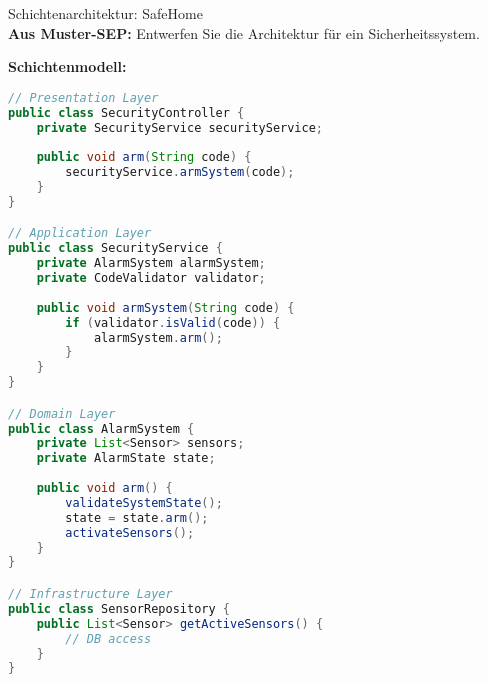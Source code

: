 \begin{example2}[breakable]{Schichtenarchitektur: SafeHome}\\
    \small
\textbf{Aus Muster-SEP:} Entwerfen Sie die Architektur für ein Sicherheitssystem.

\textbf{Schichtenmodell:}
\begin{lstlisting}[language=Java, style=basesmol]
// Presentation Layer
public class SecurityController {
    private SecurityService securityService;
    
    public void arm(String code) {
        securityService.armSystem(code);
    }
}

// Application Layer
public class SecurityService {
    private AlarmSystem alarmSystem;
    private CodeValidator validator;
    
    public void armSystem(String code) {
        if (validator.isValid(code)) {
            alarmSystem.arm();
        }
    }
}

// Domain Layer
public class AlarmSystem {
    private List<Sensor> sensors;
    private AlarmState state;
    
    public void arm() {
        validateSystemState();
        state = state.arm();
        activateSensors();
    }
}

// Infrastructure Layer
public class SensorRepository {
    public List<Sensor> getActiveSensors() {
        // DB access
    }
}
\end{lstlisting}
\end{example2}

